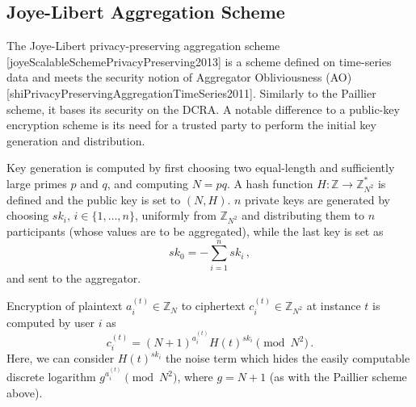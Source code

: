% 
% 

\subsection{Joye-Libert Aggregation Scheme}
The Joye-Libert privacy-preserving aggregation scheme [joyeScalableSchemePrivacyPreserving2013] is a scheme defined on time-series data and meets the security notion of Aggregator Obliviousness (AO) [shiPrivacyPreservingAggregationTimeSeries2011]. Similarly to the Paillier scheme, it bases its security on the DCRA. A notable difference to a public-key encryption scheme is its need for a trusted party to perform the initial key generation and distribution.

Key generation is computed by first choosing two equal-length and sufficiently large primes $p$ and $q$, and computing $N=pq$. A hash function $H:\mathbb{Z} \rightarrow \mathbb{Z}_{N^2}^*$ is defined and the public key is set to $(N, H)$. $n$ private keys are generated by choosing $sk_i,\,i\in\{1,\dots,n\}$, uniformly from $\mathbb{Z}_{N^2}$ and distributing them to $n$ participants (whose values are to be aggregated), while the last key is set as
\begin{equation}
    sk_0 = -\sum^{n}_{i=1}sk_i\,,
\end{equation}
and sent to the aggregator.

Encryption of plaintext $a^{(t)}_{i} \in \mathbb{Z}_N$ to ciphertext $c^{(t)}_{i} \in \mathbb{Z}_{N^2}$ at instance $t$ is computed by user $i$ as
\begin{equation}
    c^{(t)}_{i} = (N+1)^{a^{(t)}_{i}} H(t)^{sk_i} \pmod{N^2}\,.
\end{equation}
Here, we can consider $H(t)^{sk_i}$ the noise term which hides the easily computable discrete logarithm $g^{a^{(t)}_{i}} \pmod{N^2}$, where $g=N+1$ (as with the Paillier scheme above).

